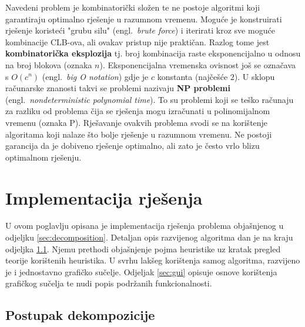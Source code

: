 \documentclass[times, utf8, diplomski]{fer}
\begin{document}
Navedeni problem je kombinatorički složen te ne postoje algoritmi koji garantiraju optimalno rješenje u razumnom vremenu. Moguće je konstruirati rješenje koristeći "grubu silu" (engl.~\textit{brute force}) i iterirati kroz sve moguće kombinacije CLB-ova, ali ovakav pristup nije praktičan. Razlog tome jest \textbf{kombinatorička eksplozija} tj. broj kombinacija raste eksponencijalno u odnosu na broj blokova (oznaka $n$). Eksponencijalna vremenska ovisnost još se označava s $O(c^{n})$ (engl.~\textit{big O notation}) gdje je $c$ konstanta (najčešće $2$). U sklopu računarske znanosti takvi se problemi nazivaju \textbf{NP problemi} (engl.~\textit{nondeterministic polynomial time}). To su problemi koji se teško računaju za razliku od problema čija se rješenja mogu izračunati u polinomijalnom vremenu (oznaka P). Rješavanje ovakvih problema svodi se na korištenje algoritama koji nalaze što bolje rješenje u razumnom vremenu. Ne postoji garancija da je dobiveno rješenje optimalno, ali zato je često vrlo blizu optimalnom rješenju.


\chapter{Implementacija rješenja} \label{chapter:impl}

U ovom poglavlju opisana je implementacija rješenja problema objašnjenog u odjeljku \ref{sec:decomposition}. Detaljan opis razvijenog algoritma dan je na kraju odjeljka \ref{sec:impl_decomp}. Njemu prethodi objašnjenje pojma heuristike uz kratak pregled teorije korištenih heuristika. U svrhu lakšeg korištenja samog algoritma, razvijeno je i jednostavno grafičko sučelje. Odjeljak \ref{sec:gui} opisuje osnove korištenja grafičkog sučelja te nudi popis podržanih funkcionalnosti.


\section{Postupak dekompozicije} \label{sec:impl_decomp}
\end{document}
